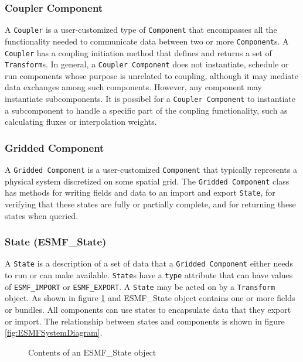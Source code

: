 \subsubsection{Coupler Component }
A {\tt Coupler} is a user-customized type of {\tt Component} that 
encompasses all the functionality needed to communicate data between two or 
more {\tt Component}s.  A {\tt Coupler} has a coupling initiation method that 
defines and returns a set of {\tt Transform}s. In general, a {\tt Coupler Component} does not instantiate, schedule or run components whose purpose is unrelated 
to coupling, although it may mediate data exchanges among such components.
However, any component may instantiate subcomponents. It is possibel
for a {\tt Coupler Component} to instantiate a subcomponent to handle a
specific part of the coupling functionality, such as calculating fluxes
or interpolation weights.


\subsubsection{Gridded Component }
\label{sec:griddedcomponent} 
A {\tt Gridded Component} is a user-customized {\tt Component} 
that typically represents a physical system discretized on some spatial grid.
The {\tt Gridded Component} class has methods for writing 
fields and data to an import and export {\tt State}, for verifying that
these states are fully or partially complete, and for returning these
states when queried.

\subsubsection{State (ESMF\_State)}
A {\tt State} is a description of a set of data that a 
{\tt Gridded Component} either needs to run or can make available.  
{\tt State}s
have a {\tt type} attribute that can have values of {\tt ESMF\_IMPORT} or
{\tt ESMF\_EXPORT}.  A {\tt State} may be acted on by a {\tt Transform} object.
As shown in figure \ref{fig:ESMFStateDiagram} and ESMF\_State object contains 
one or more fields or bundles. All components can use states to encapsulate 
data that they export or import. The relationship between states and 
components is shown in figure \ref{fig:ESMFSystemDiagram}.

\begin{figure}
\caption[{ESMF State Contents}]{Contents of an ESMF\_State object}
\label{fig:ESMFStateDiagram}
\end{figure}

